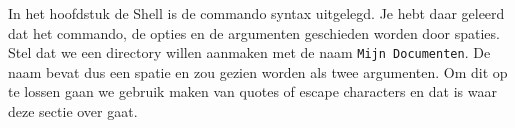 In het hoofdstuk de Shell is de commando syntax uitgelegd. Je hebt daar geleerd dat het commando, de opties en de argumenten geschieden worden door spaties. Stel dat we een directory willen aanmaken met de naam \texttt{Mijn Documenten}. De naam bevat dus een spatie en zou gezien worden als twee argumenten. Om dit op te lossen gaan we gebruik maken van quotes of escape characters en dat is waar deze sectie over gaat.

